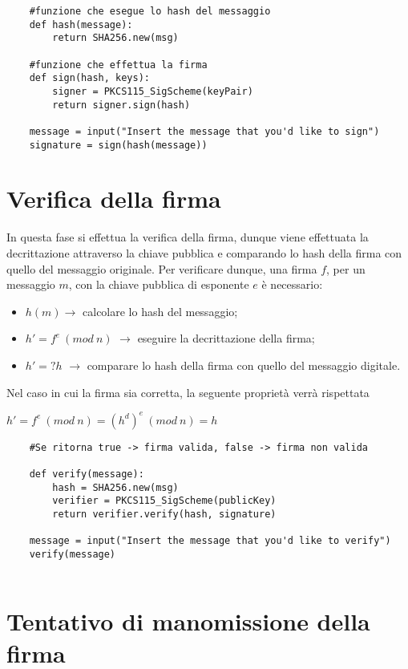 \begin{lstlisting}
	#funzione che esegue lo hash del messaggio
	def hash(message):
		return SHA256.new(msg)
	
	#funzione che effettua la firma
	def sign(hash, keys):
		signer = PKCS115_SigScheme(keyPair)
		return signer.sign(hash)
	
	message = input("Insert the message that you'd like to sign")
	signature = sign(hash(message))
\end{lstlisting}

\newpage

\section{Verifica della firma}

In questa fase si effettua la verifica della firma, dunque viene effettuata la decrittazione attraverso la chiave pubblica e comparando lo hash della firma con quello del messaggio originale.
Per verificare dunque, una firma $f$, per un messaggio $m$, con la chiave pubblica di esponente $e$ è necessario:
\begin{itemize}
	\item $h(m) \rightarrow$ calcolare lo hash del messaggio;
	\item $h' = f^e \: (mod \: n)$ $\rightarrow$ eseguire la decrittazione della firma;
	\item $h' =? h$ $\rightarrow$ comparare lo hash della firma con quello del messaggio digitale.
\end{itemize}

Nel caso in cui la firma sia corretta, la seguente proprietà verrà rispettata

\begin{center}
	$h'=f^{e} \: (mod \: n) = (h^d)^e \: (mod \: n) = h$
\end{center} 

\begin{lstlisting}
	#Se ritorna true -> firma valida, false -> firma non valida
	
	def verify(message):
		hash = SHA256.new(msg)
		verifier = PKCS115_SigScheme(publicKey)
		return verifier.verify(hash, signature)
	
	message = input("Insert the message that you'd like to verify")
	verify(message)
	
\end{lstlisting}



\section{Tentativo di manomissione della firma}


